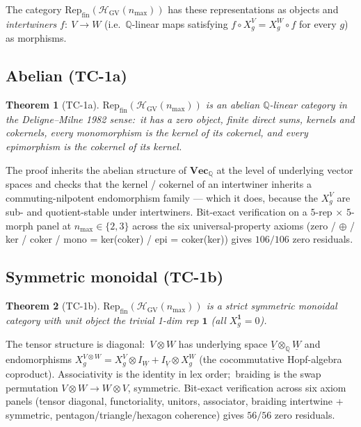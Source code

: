 \documentclass[11pt,a4paper]{article}
\theoremstyle{plain}
\newtheorem{theorem}{Theorem}[section]
\theoremstyle{definition}
\newcommand{\nmax}{n_{\max}}
\newcommand{\HGV}{\mathcal{H}_{\mathrm{GV}}}
\newcommand{\Repcat}{\mathrm{Rep}_{\mathrm{fin}}}
\newcommand{\Vecbf}{\mathbf{Vec}}
\newcommand{\Q}{\mathbb{Q}}
\begin{document}
The category $\Repcat(\HGV(\nmax))$ has these representations as
objects and \emph{intertwiners} $f :\ V \to W$ (i.e.\ $\Q$-linear maps
satisfying $f \circ X_{g}^{V} = X_{g}^{W} \circ f$ for every $g$) as
morphisms.

\subsection{Abelian (TC-1a)}\label{sec:abelian}

\begin{theorem}[TC-1a]\label{thm:abelian}
$\Repcat(\HGV(\nmax))$ is an abelian $\Q$-linear category in the
Deligne--Milne 1982 sense:\ it has a zero object, finite direct sums,
kernels and cokernels, every monomorphism is the kernel of its
cokernel, and every epimorphism is the cokernel of its kernel.
\end{theorem}

The proof inherits the abelian structure of $\Vecbf_{\Q}$ at the level
of underlying vector spaces and checks that the kernel / cokernel of an
intertwiner inherits a commuting-nilpotent endomorphism family ---
which it does, because the $X_{g}^{V}$ are sub- and quotient-stable
under intertwiners. Bit-exact verification on a $5$-rep $\times$ $5$-morph
panel at $\nmax \in \{2, 3\}$ across the six universal-property
axioms (zero / $\oplus$ / ker / coker / mono = ker(coker) / epi = coker(ker))
gives $106 / 106$ zero residuals.

\subsection{Symmetric monoidal (TC-1b)}\label{sec:monoidal}

\begin{theorem}[TC-1b]\label{thm:monoidal}
$\Repcat(\HGV(\nmax))$ is a strict symmetric monoidal category with
unit object the trivial 1-dim rep $\mathbf{1}$ (all $X_{g}^{\mathbf{1}} = 0$).
\end{theorem}

The tensor structure is diagonal:\ $V \otimes W$ has underlying space
$\underline{V} \otimes_{\Q} \underline{W}$ and endomorphisms
$X_{g}^{V \otimes W} = X_{g}^{V} \otimes I_{\underline{W}} +
I_{\underline{V}} \otimes X_{g}^{W}$ (the cocommutative Hopf-algebra
coproduct). Associativity is the identity in lex order;\ braiding is
the swap permutation $V \otimes W \to W \otimes V$, symmetric.
Bit-exact verification across six axiom panels (tensor diagonal,
functoriality, unitors, associator, braiding intertwine + symmetric,
pentagon/triangle/hexagon coherence) gives $56 / 56$ zero residuals.
\end{document}
